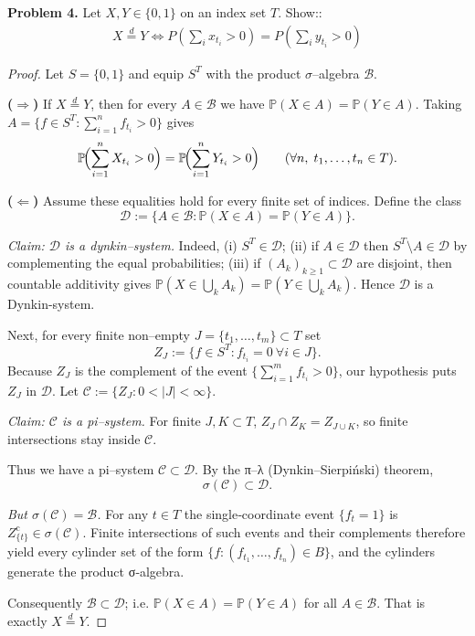 \documentclass[11pt]{article}
\begin{document}
\textbf{Problem 4.} \newline
Let $X,Y \in \{0,1\}$ on an index set $T$. \newline 
Show::
\begin{align}
	X \overset{d}{=} Y \iff P\left(\sum_i x_{t_i} > 0 \right) = P\left(\sum_i y_{t_i} > 0 \right)
\end{align}
\begin{proof}
Let $S=\{0,1\}$ and equip $S^{T}$ with the product $\sigma$–algebra
$\mathcal B$.

\medskip
\noindent\textbf{($\Rightarrow$)}\;
If $X\stackrel d=Y$, then for every $A\in\mathcal B$ we have
$\mathbb P(X\in A)=\mathbb P(Y\in A)$.  
Taking
\(
A=\bigl\{f\in S^{T}:\sum_{i=1}^{n}f_{t_{i}}>0\bigr\}
\)
gives
\[
\mathbb P\!\Bigl(\sum_{i=1}^{n}X_{t_{i}}>0\Bigr)=
\mathbb P\!\Bigl(\sum_{i=1}^{n}Y_{t_{i}}>0\Bigr)
\qquad(\forall n,\;t_{1},\dots ,t_{n}\in T).
\]

\medskip
\noindent\textbf{($\Leftarrow$)}\;
Assume these equalities hold for every finite set of indices.  
Define the class
\[
\mathcal D:=\bigl\{A\in\mathcal B:
      \mathbb P(X\in A)=\mathbb P(Y\in A)\bigr\}.
\]

\emph{Claim: \(\mathcal D\) is a dynkin–system.}
Indeed,
(i) $S^{T}\in\mathcal D$;
(ii) if $A\in\mathcal D$ then
$S^{T}\!\setminus\!A\in\mathcal D$ by complementing the equal
probabilities;  
(iii) if $(A_k)_{k\ge1}\subset\mathcal D$ are disjoint, then
countable additivity gives
\(\mathbb P(X\in\bigcup_kA_k)=\mathbb P(Y\in\bigcup_kA_k)\).
Hence \(\mathcal D\) is a Dynkin-system.

Next, for every finite non–empty
\(J=\{t_{1},\dots ,t_{m}\}\subset T\) set
\[
Z_{J}:=\bigl\{f\in S^{T}:f_{t_{i}}=0\ \forall i\in J\bigr\}.
\]
Because $Z_{J}$ is the complement of the event
\(\{\sum_{i=1}^{m}f_{t_{i}}>0\}\),
our hypothesis puts \(Z_{J}\) in \(\mathcal D\).
Let
\(
\mathcal C:=\{Z_{J}:0<|J|<\infty\}.
\)

\emph{Claim: \(\mathcal C\) is a pi–system.}
For finite $J,K\subset T$,
\(Z_{J}\cap Z_{K}=Z_{J\cup K}\), so finite intersections stay inside
\(\mathcal C\).

Thus we have a pi–system \(\mathcal C\subset\mathcal D\).
By the π–λ (Dynkin–Sierpiński) theorem,
\[
\sigma(\mathcal C)\subset\mathcal D.
\]

\medskip
\emph{But \(\sigma(\mathcal C)=\mathcal B\).}
For any $t\in T$ the single‑coordinate event
\(\{f_{t}=1\}\) is \(Z_{\{t\}}^{\mathrm c}\in\sigma(\mathcal C)\).
Finite intersections of such events and their complements therefore
yield every cylinder set of the form
\(\{f:(f_{t_{1}},\dots ,f_{t_{n}})\in B\}\),
and the cylinders generate the product σ‑algebra.  

\medskip
Consequently \(\mathcal B\subset\mathcal D\); i.e.
\(\mathbb P(X\in A)=\mathbb P(Y\in A)\) for all
\(A\in\mathcal B\).  That is exactly \(X\stackrel d=Y\).
\end{proof}
\end{document}
